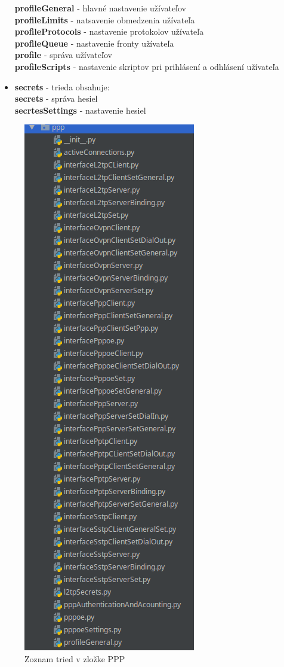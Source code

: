 \begin{itemize}
\textbf{profileGeneral} - hlavné nastavenie užívateľov\\
\textbf{profileLimits} - natsavenie obmedzenia užívateľa\\
\textbf{profileProtocols} - nastavenie protokolov užívateľa\\
\textbf{profileQueue} - nastavenie fronty užívateľa\\
\textbf{profile} - správa užívateľov\\
\textbf{profileScripts} - nastavenie skriptov pri prihlásení a odhlásení užívateľa
\item \textbf{secrets} - trieda obsahuje:\\
\textbf{secrets} - správa hesiel\\
\textbf{secrtesSettings} - nastavenie hesiel
\end{itemize}
\begin{figure}[H]
\centering
\includegraphics[scale=0.6]{../text/ppplist.png}
\caption{Zoznam tried v zložke PPP}
\label{fig:pppset}
\end{figure}
